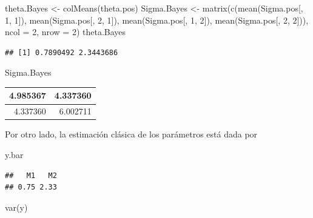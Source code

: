 \documentclass[
  10pt,
  spanish,
]{book}
\newenvironment{Shaded}{\begin{snugshade}}{\end{snugshade}}
\newcommand{\AttributeTok}[1]{\textcolor[rgb]{0.77,0.63,0.00}{#1}}
\newcommand{\DecValTok}[1]{\textcolor[rgb]{0.00,0.00,0.81}{#1}}
\newcommand{\FunctionTok}[1]{\textcolor[rgb]{0.00,0.00,0.00}{#1}}
\newcommand{\NormalTok}[1]{#1}
\newcommand{\OtherTok}[1]{\textcolor[rgb]{0.56,0.35,0.01}{#1}}
\theoremstyle{definition}
\theoremstyle{definition}
\theoremstyle{definition}
\theoremstyle{definition}
\theoremstyle{remark}
\begin{document}
\begin{Shaded}
\begin{Highlighting}[]
\NormalTok{theta.Bayes }\OtherTok{\textless{}{-}} \FunctionTok{colMeans}\NormalTok{(theta.pos)}
\NormalTok{Sigma.Bayes }\OtherTok{\textless{}{-}} \FunctionTok{matrix}\NormalTok{(}\FunctionTok{c}\NormalTok{(}\FunctionTok{mean}\NormalTok{(Sigma.pos[, }\DecValTok{1}\NormalTok{, }\DecValTok{1}\NormalTok{]),}
                        \FunctionTok{mean}\NormalTok{(Sigma.pos[, }\DecValTok{2}\NormalTok{, }\DecValTok{1}\NormalTok{]),}
                        \FunctionTok{mean}\NormalTok{(Sigma.pos[, }\DecValTok{1}\NormalTok{, }\DecValTok{2}\NormalTok{]),}
                        \FunctionTok{mean}\NormalTok{(Sigma.pos[, }\DecValTok{2}\NormalTok{, }\DecValTok{2}\NormalTok{])), }
                      \AttributeTok{ncol =} \DecValTok{2}\NormalTok{, }\AttributeTok{nrow =} \DecValTok{2}\NormalTok{)}
\NormalTok{theta.Bayes}
\end{Highlighting}
\end{Shaded}

\begin{verbatim}
## [1] 0.7890492 2.3443686
\end{verbatim}

\begin{Shaded}
\begin{Highlighting}[]
\NormalTok{Sigma.Bayes}
\end{Highlighting}
\end{Shaded}

\begin{tabular}{r|r}
\hline
4.985367 & 4.337360\\
\hline
4.337360 & 6.002711\\
\hline
\end{tabular}

Por otro lado, la estimación clásica de los parámetros está dada por

\begin{Shaded}
\begin{Highlighting}[]
\NormalTok{y.bar}
\end{Highlighting}
\end{Shaded}

\begin{verbatim}
##   M1   M2 
## 0.75 2.33
\end{verbatim}

\begin{Shaded}
\begin{Highlighting}[]
\FunctionTok{var}\NormalTok{(y)}
\end{Highlighting}
\end{Shaded}
\end{document}

